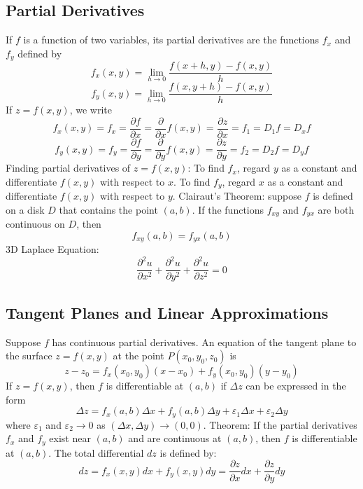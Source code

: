 \documentclass{article}
\begin{document}
    \subsection{Partial Derivatives}
    \begin{outline}
        \1 If $f$ is a function of two variables, its partial derivatives are the functions $f_x$ and $f_y$ defined by \[f_x(x,y)=\lim_{h\to0}\dfrac{f(x+h,y)-f(x,y)}{h}\]\[f_y(x,y)=\lim_{h\to0}\dfrac{f(x,y+h)-f(x,y)}{h}\]
        \1 If \(z=f(x,y)\), we write \[f_x(x,y)=f_x=\dfrac{\partial f}{\partial x}=\dfrac{\partial}{\partial x}f(x,y)=\dfrac{\partial z}{\partial x}=f_1=D_1f=D_xf\]\[f_y(x,y)=f_y=\dfrac{\partial f}{\partial y}=\dfrac{\partial}{\partial y}f(x,y)=\dfrac{\partial z}{\partial y}=f_2=D_2f=D_yf\]
        \1 Finding partial derivatives of \(z=f(x,y)\):
            \2 To find $f_x$, regard $y$ as a constant and differentiate \(f(x,y)\) with respect to $x$. 
            \2 To find $f_y$, regard $x$ as a constant and differentiate \(f(x,y)\) with respect to $y$. 
        \1 Clairaut's Theorem: suppose $f$ is defined on a disk $D$ that contains the point \((a,b)\). If the functions \(f_{xy}\) and \(f_{yx}\) are both continuous on $D$, then \[f_{xy}(a,b)=f_{yx}(a,b)\]
        \1 3D Laplace Equation: \[\dfrac{\partial^2u}{\partial x^2}+\dfrac{\partial^2u}{\partial y^2}+\dfrac{\partial^2u}{\partial z^2}=0\]

    \end{outline}
    \subsection{Tangent Planes and Linear Approximations}
    \begin{outline}
        \1 Suppose $f$ has continuous partial derivatives. An equation of the tangent plane to the surface \(z=f(x,y)\) at the point \(P(x_0,y_0,z_0)\) is \[z-z_0=f_x(x_0,y_0)(x-x_0)+f_y(x_0,y_0)(y-y_0)\]
        \1 If \(z=f(x,y)\), then $f$ is differentiable at \((a,b)\) if \(\Delta z\) can be expressed in the form \[\Delta z=f_x(a,b)\Delta x+f_y(a,b)\Delta y+\varepsilon_1\Delta x+\varepsilon_2\Delta y\] where \(\varepsilon_1\) and \(\varepsilon_2\to 0\) as \((\Delta x,\Delta y)\to(0,0)\). 
        \1 Theorem: If the partial derivatives \(f_x\) and \(f_y\) exist near \((a,b)\) and are continuous at \((a,b)\), then $f$ is differentiable at \((a,b)\). 
        \1 The total differential $dz$ is defined by: \[dz=f_x(x,y)dx+f_y(x,y)dy=\dfrac{\partial z}{\partial x}dx+\dfrac{\partial z}{\partial y}dy\]

    \end{outline}
\end{document}
